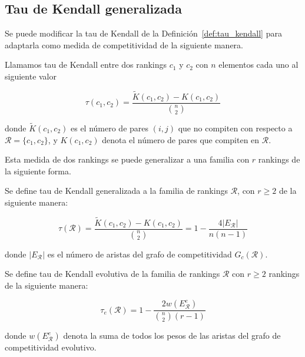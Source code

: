 \subsection*{Tau de Kendall generalizada}

Se puede modificar la tau de Kendall de la Definición~\ref{def:tau_kendall} para adaptarla como medida de competitividad de la siguiente manera.

\begin{defi}
Llamamos tau de Kendall entre dos rankings $c_1$ y $c_2$ con $n$ elementos cada uno al siguiente valor

\begin{equation}
\tau(c_1, c_2) = \dfrac{\tilde{K}(c_1, c_2) - K(c_1, c_2)}{\binom{n}{2}}
\end{equation} 

donde $\tilde{K}(c_1, c_2)$ es el número de pares $(i,j)$ que no compiten con respecto a $\mathcal{R} = \{c_1, c_2\}$, y $K(c_1, c_2)$ denota el número de pares que compiten en $\mathcal{R}$.
\end{defi}

Esta medida de dos rankings se puede generalizar a una familia con $r$ rankings de la siguiente forma.

\begin{defi}
Se define tau de Kendall generalizada a la familia de rankings $\mathcal{R}$, con $r \geq 2$ de la siguiente manera:

\begin{equation}
\tau(\mathcal{R}) = \dfrac{\tilde{K}(c_1, c_2) - K(c_1, c_2)}{\binom{n}{2}} = 1 - \dfrac{4 |E_\mathcal{R}|}{n(n-1)}
\end{equation}

donde $|E_\mathcal{R}|$ es el número de aristas del grafo de competitividad $G_c(\mathcal{R})$.
\end{defi}

\begin{defi}
Se define tau de Kendall evolutiva de la familia de rankings $\mathcal{R}$ con $r \geq 2$ rankings de la siguiente manera:

\begin{equation}
\tau_e(\mathcal{R}) = 1 - \dfrac{2 w(E_\mathcal{R}^e)}{\binom{n}{2}(r-1)}
\end{equation} 

donde $w(E_\mathcal{R}^e)$ denota la suma de todos los pesos de las aristas del grafo de competitividad evolutivo.
\end{defi}

